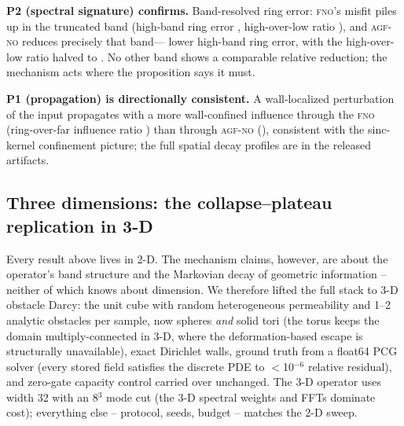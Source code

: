 \documentclass[11pt]{article}
\theoremstyle{definition}
\newcommand{\fno}{\textsc{fno}}
\newcommand{\agfno}{\textsc{agf-no}}
\begin{document}
\textbf{P2 (spectral signature) confirms.} Band-resolved ring error:
\fno{}'s misfit piles up in the truncated band (high-band ring error
\FreqFnoHighRing{}, high-over-low ratio \FreqFnoHighOverLow{}), and \agfno{}
reduces precisely that band---\FreqAgfHighRingRed{} lower high-band ring
error, with the high-over-low ratio halved to \FreqAgfHighOverLow{}. No
other band shows a comparable relative reduction; the mechanism acts where
the proposition says it must.

\textbf{P1 (propagation) is directionally consistent.} A wall-localized
perturbation of the input propagates with a more wall-confined influence
through the \fno{} (ring-over-far influence ratio \FreqPoneFnoRingOverFar{})
than through \agfno{} (\FreqPoneAgfRingOverFar{}), consistent with the
sinc-kernel confinement picture; the full spatial decay profiles are in the
released artifacts.

\subsection{Three dimensions: the collapse--plateau replication in 3-D}
\label{sec:3d}

Every result above lives in 2-D. The mechanism claims, however, are about
the operator's band structure and the Markovian decay of geometric
information -- neither of which knows about dimension. We therefore lifted
the full stack to 3-D obstacle Darcy: the unit cube with random heterogeneous
permeability and 1--2 analytic obstacles per sample, now spheres \emph{and}
solid tori (the torus keeps the domain multiply-connected in 3-D, where the
deformation-based escape is structurally unavailable), exact Dirichlet
walls, ground truth from a float64 PCG solver (every stored field satisfies
the discrete PDE to $<$10$^{-6}$ relative residual), and zero-gate capacity
control carried over unchanged. The 3-D operator uses width 32 with an
8$^3$ mode cut (the 3-D spectral weights and FFTs dominate cost); everything
else -- protocol, seeds, budget -- matches the 2-D sweep.
\end{document}
